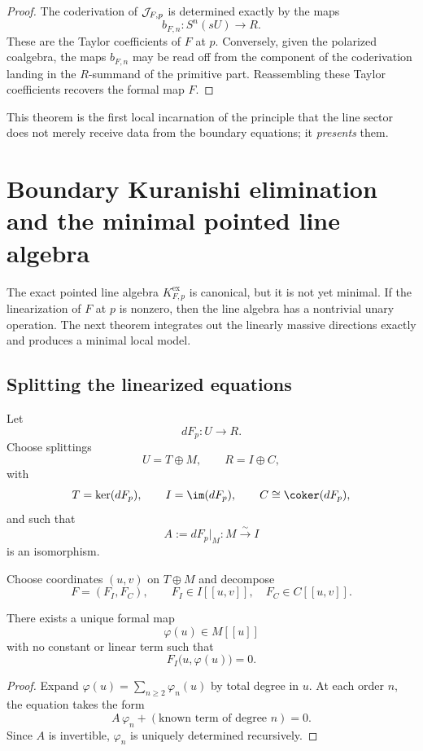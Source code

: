 \begin{proof}
The coderivation of $\mathcal J_{F,p}$ is determined exactly by the maps
\[
b_{F,n}:S^n(sU)\to R.
\]
These are the Taylor coefficients of $F$ at $p$. Conversely, given the polarized coalgebra, the maps $b_{F,n}$ may be read off from the component of the coderivation landing in the $R$-summand of the primitive part. Reassembling these Taylor coefficients recovers the formal map $F$.
\end{proof}

\begin{remark}
This theorem is the first local incarnation of the principle that the line sector does not merely receive data from the boundary equations; it \emph{presents} them.
\end{remark}


\section{Boundary Kuranishi elimination and the minimal pointed line algebra}\label{sec:kuranishi}

The exact pointed line algebra $K_{F,p}^{\mathrm{ex}}$ is canonical, but it is not yet minimal. If the linearization of $F$ at $p$ is nonzero, then the line algebra has a nontrivial unary operation. The next theorem integrates out the linearly massive directions exactly and produces a minimal local model.

\subsection{Splitting the linearized equations}

Let
\[
dF_p:U\to R.
\]
Choose splittings
\[
U=T\oplus M,
\qquad
R=I\oplus C,
\]
with
\[
T=\ker(dF_p),
\qquad
I=\im(dF_p),
\qquad
C\cong \coker(dF_p),
\]
and such that
\[
A:=dF_p|_M:M\xrightarrow{\sim} I
\]
is an isomorphism.

Choose coordinates $(u,v)$ on $T\oplus M$ and decompose
\[
F=(F_I,F_C),
\qquad
F_I\in I[[u,v]],
\quad
F_C\in C[[u,v]].
\]

\begin{lemma}\label{lem:formal-implicit}
There exists a unique formal map
\[
\varphi(u)\in M[[u]]
\]
with no constant or linear term such that
\[
F_I\bigl(u,\varphi(u)\bigr)=0.
\]
\end{lemma}

\begin{proof}
Expand $\varphi(u)=\sum_{n\ge 2}\varphi_n(u)$ by total degree in $u$. At each order $n$, the equation takes the form
\[
A\,\varphi_n + (\text{known term of degree }n)=0.
\]
Since $A$ is invertible, $\varphi_n$ is uniquely determined recursively.
\end{proof}

